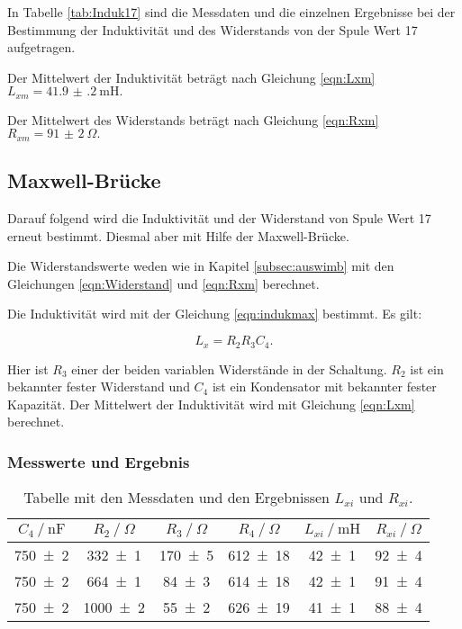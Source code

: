 In Tabelle \ref{tab:Induk17} sind die Messdaten und die einzelnen
Ergebnisse bei der Bestimmung der Induktivität und des Widerstands
von der Spule Wert 17 aufgetragen.

Der Mittelwert der Induktivität beträgt nach Gleichung \eqref{eqn:Lxm}
$L_{xm} = \SI{41.9(2)}{\milli\henry}.$

Der Mittelwert des Widerstands beträgt nach Gleichung \eqref{eqn:Rxm}
$R_{xm} = \SI{91(2)}{\Omega}.$

\subsection{Maxwell-Brücke}

Darauf folgend wird die Induktivität und der Widerstand von Spule Wert 17 erneut
bestimmt. Diesmal aber mit Hilfe der Maxwell-Brücke.

Die Widerstandswerte weden wie in Kapitel \ref{subsec:auswimb} mit den Gleichungen
\eqref{eqn:Widerstand} und \eqref{eqn:Rxm} berechnet.

Die Induktivität wird mit der Gleichung \eqref{eqn:indukmax} bestimmt.
Es gilt:

\begin{equation}
  L_x = R_2 R_3 C_4.
  \label{eqn:indukmax}
\end{equation}

Hier ist $R_3$ einer der beiden variablen Widerstände in der Schaltung. $R_2$
ist ein bekannter fester Widerstand und $C_4$ ist ein Kondensator mit bekannter
fester Kapazität.
Der Mittelwert der Induktivität wird mit Gleichung \eqref{eqn:Lxm} berechnet.

\subsubsection{Messwerte und Ergebnis}

\begin{table}
  \centering
  \caption{Tabelle mit den Messdaten und den Ergebnissen $L_{xi}$ und $R_{xi}$.}
  \label{tab:Indukmax17}
  \begin{tabular}{c c c c c c}
    \toprule
    $C_4 \ /\ \si{\nano\farad}$ & $R_2 \ /\ \si{\Omega}$ & $R_3 \ /\ \si{\Omega}$ &
    $R_4 \ /\ \si{\Omega}$ & $L_{xi} \ /\ \si{\milli\henry}$ & $R_{xi} \ /\ \si{\Omega}$ \\
    \midrule
    \num{750 +- 2} & \num{332 +- 1} & \num{170 +- 5} & \num{612 +- 18} & \num{42 +- 1} & \num{92 +- 4}\\
    \num{750 +- 2} & \num{664 +- 1} & \num{84 +- 3} & \num{614 +- 18} & \num{42 +- 1} & \num{91 +- 4}\\
    \num{750 +- 2} & \num{1000 +- 2} & \num{55 +- 2} & \num{626 +- 19} & \num{41 +- 1} & \num{88 +- 4}\\
    \bottomrule
  \end{tabular}
\end{table}

